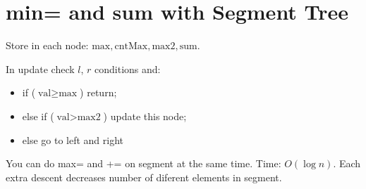 \section*{min= and sum with Segment Tree}

Store in each node: $\text{max}, \text{cntMax}, \text{max2}, \text{sum}$.

In update check $l$, $r$ conditions and: 
\begin{itemize}
\item if ($\text{val} \ge \text{max}$) return;
\item else if ($\text{val} > \text{max2}$) update this node;
\item else go to left and right
\end{itemize}

You can do max= and += on segment at the same time.
Time: $O(\log n)$. Each extra descent decreases number of diferent elements in segment. 
